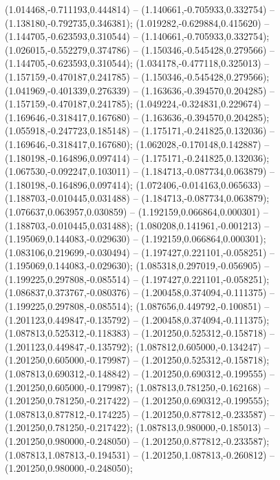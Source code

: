  (1.014468,-0.711193,0.444814) -- (1.140661,-0.705933,0.332754) -- (1.138180,-0.792735,0.346381);
 (1.019282,-0.629884,0.415620) -- (1.144705,-0.623593,0.310544) -- (1.140661,-0.705933,0.332754);
 (1.026015,-0.552279,0.374786) -- (1.150346,-0.545428,0.279566) -- (1.144705,-0.623593,0.310544);
 (1.034178,-0.477118,0.325013) -- (1.157159,-0.470187,0.241785) -- (1.150346,-0.545428,0.279566);
 (1.041969,-0.401339,0.276339) -- (1.163636,-0.394570,0.204285) -- (1.157159,-0.470187,0.241785);
 (1.049224,-0.324831,0.229674) -- (1.169646,-0.318417,0.167680) -- (1.163636,-0.394570,0.204285);
 (1.055918,-0.247723,0.185148) -- (1.175171,-0.241825,0.132036) -- (1.169646,-0.318417,0.167680);
 (1.062028,-0.170148,0.142887) -- (1.180198,-0.164896,0.097414) -- (1.175171,-0.241825,0.132036);
 (1.067530,-0.092247,0.103011) -- (1.184713,-0.087734,0.063879) -- (1.180198,-0.164896,0.097414);
 (1.072406,-0.014163,0.065633) -- (1.188703,-0.010445,0.031488) -- (1.184713,-0.087734,0.063879);
 (1.076637,0.063957,0.030859) -- (1.192159,0.066864,0.000301) -- (1.188703,-0.010445,0.031488);
 (1.080208,0.141961,-0.001213) -- (1.195069,0.144083,-0.029630) -- (1.192159,0.066864,0.000301);
 (1.083106,0.219699,-0.030494) -- (1.197427,0.221101,-0.058251) -- (1.195069,0.144083,-0.029630);
 (1.085318,0.297019,-0.056905) -- (1.199225,0.297808,-0.085514) -- (1.197427,0.221101,-0.058251);
 (1.086837,0.373767,-0.080376) -- (1.200458,0.374094,-0.111375) -- (1.199225,0.297808,-0.085514);
 (1.087656,0.449792,-0.100851) -- (1.201123,0.449847,-0.135792) -- (1.200458,0.374094,-0.111375);
 (1.087813,0.525312,-0.118383) -- (1.201250,0.525312,-0.158718) -- (1.201123,0.449847,-0.135792);
 (1.087812,0.605000,-0.134247) -- (1.201250,0.605000,-0.179987) -- (1.201250,0.525312,-0.158718);
 (1.087813,0.690312,-0.148842) -- (1.201250,0.690312,-0.199555) -- (1.201250,0.605000,-0.179987);
 (1.087813,0.781250,-0.162168) -- (1.201250,0.781250,-0.217422) -- (1.201250,0.690312,-0.199555);
 (1.087813,0.877812,-0.174225) -- (1.201250,0.877812,-0.233587) -- (1.201250,0.781250,-0.217422);
 (1.087813,0.980000,-0.185013) -- (1.201250,0.980000,-0.248050) -- (1.201250,0.877812,-0.233587);
 (1.087813,1.087813,-0.194531) -- (1.201250,1.087813,-0.260812) -- (1.201250,0.980000,-0.248050);
